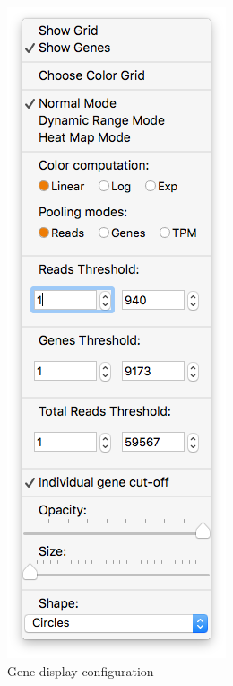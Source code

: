 \documentclass[10pt,a4paper,titlepage]{book}
\begin{document}
\begin{figure}[h]
	\centering
	\includegraphics[scale=0.5]{./Pictures/menu_1}
	\caption{Gene display configuration}
	\label{fig:gene_display_config}
\end{figure}
\end{document}
